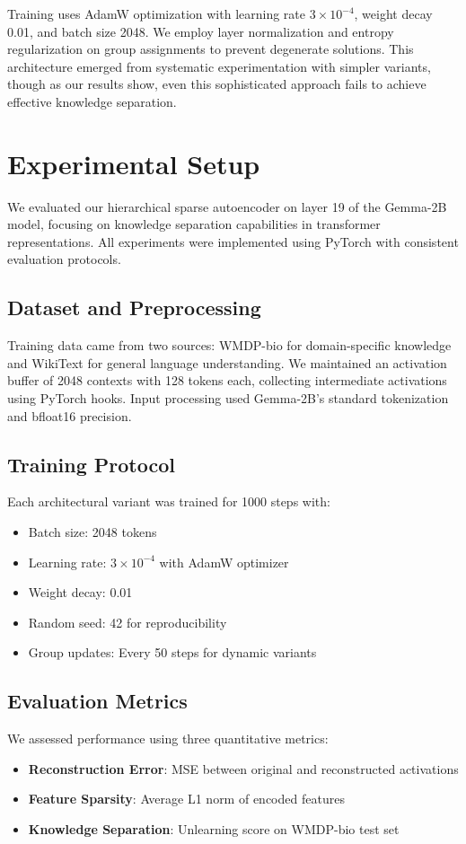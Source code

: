 \documentclass{article} %
\begin{document}
Training uses AdamW optimization with learning rate $3\times10^{-4}$, weight decay 0.01, and batch size 2048. We employ layer normalization and entropy regularization on group assignments to prevent degenerate solutions. This architecture emerged from systematic experimentation with simpler variants, though as our results show, even this sophisticated approach fails to achieve effective knowledge separation.

\section{Experimental Setup}
\label{sec:experimental}

We evaluated our hierarchical sparse autoencoder on layer 19 of the Gemma-2B model, focusing on knowledge separation capabilities in transformer representations. All experiments were implemented using PyTorch \cite{paszke2019pytorch} with consistent evaluation protocols.

\subsection{Dataset and Preprocessing}
Training data came from two sources: WMDP-bio for domain-specific knowledge and WikiText for general language understanding. We maintained an activation buffer of 2048 contexts with 128 tokens each, collecting intermediate activations using PyTorch hooks. Input processing used Gemma-2B's standard tokenization and bfloat16 precision.

\subsection{Training Protocol}
Each architectural variant was trained for 1000 steps with:
\begin{itemize}
    \item Batch size: 2048 tokens
    \item Learning rate: $3\times10^{-4}$ with AdamW optimizer
    \item Weight decay: 0.01
    \item Random seed: 42 for reproducibility
    \item Group updates: Every 50 steps for dynamic variants
\end{itemize}

\subsection{Evaluation Metrics}
We assessed performance using three quantitative metrics:
\begin{itemize}
    \item \textbf{Reconstruction Error}: MSE between original and reconstructed activations
    \item \textbf{Feature Sparsity}: Average L1 norm of encoded features
    \item \textbf{Knowledge Separation}: Unlearning score on WMDP-bio test set
\end{itemize}
\end{document}
